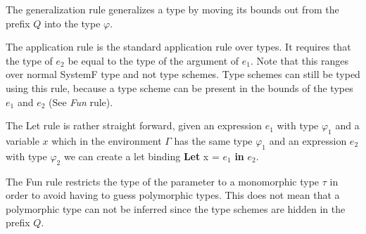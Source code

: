 \documentclass[twoside, titlepage, openright, a4paper]{book}
\begin{document}
The generalization rule generalizes a type by moving its bounds out from the prefix $Q$ into the type $\varphi$.

\begin{prooftree}
\end{prooftree}

The application rule is the standard application rule over types. It requires that the type of $e_2$ be equal to the type of the argument of $e_1$. Note that this ranges over normal SystemF type and not type schemes. Type schemes can still be typed using this rule, because a type scheme can be present in the bounds of the types $e_1$ and $e_2$ (See \emph{Fun} rule).

\begin{prooftree}
\end{prooftree}

The Let rule is rather straight forward, given an expression $e_1$ with type $\varphi_1$ and a variable $x$ which in the environment $\Gamma$ has the same type $\varphi_1$ and an expression $e_2$ with type $\varphi_2$ we can create a let binding \textbf{Let} x = $e_1$ \textbf{in} $e_2$.

\begin{prooftree}
\end{prooftree}

The Fun rule restricts the type of the parameter to a monomorphic type $\tau$ in order to avoid having to guess polymorphic types. This does not mean that a polymorphic type can not be inferred since the type schemes are hidden in the prefix $Q$.

\begin{prooftree}
\end{prooftree}
\end{document}
